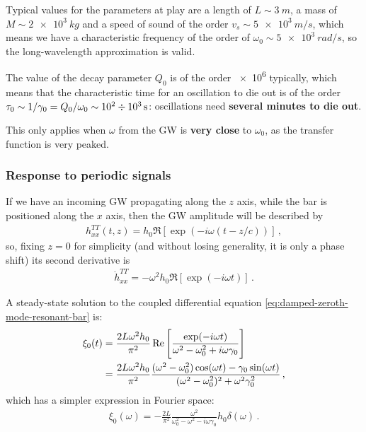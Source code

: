 \documentclass[main.tex]{subfiles}
\begin{document}
Typical values for the parameters at play are a length of \(L \sim \SI{3}{m}\), a mass of \(M \sim \SI{2e3}{kg}\) and a speed of sound of the order \(v_s \sim \SI{5e3}{m/s}\), which means we have a characteristic frequency of the order of \(\omega_0 \sim \SI{5e3}{rad / s}\), so the long-wavelength approximation is valid. 

The value of the decay parameter \(Q_0 \) is of the order \num{e6} typically, which means that the characteristic time for an oscillation to die out is of the order \(\tau_0 \sim 1/ \gamma_0 = Q_0 / \omega_0 \sim \num{e2} \divisionsymbol \SI{e3}{s}\): oscillations need \textbf{several minutes to die out}. 

This only applies when \(\omega \) from the GW is \textbf{very close} to \(\omega_0 \), as the transfer function is very peaked. 


\subsubsection{Response to periodic signals}

If we have an incoming GW propagating along the \(z\) axis, while the bar is positioned along the \(x\) axis, then the GW amplitude will be described by 
%
\begin{align}
h_{xx}^{TT} (t, z) = h_0 \Re[\exp(-i \omega (t - z/c))]
\,,
\end{align}
%
so, fixing \(z =0 \) for simplicity (and without losing generality, it is only a phase shift) its second derivative is 
%
\begin{align}
\ddot{h}_{xx}^{TT} = - \omega^2 h_0 \Re[\exp(-i \omega t)]
\,.
\end{align}

A steady-state solution to the coupled differential equation \eqref{eq:damped-zeroth-mode-resonant-bar} is:
%
\begin{align}
\xi_0 (t) &= \frac{2L \omega^2 h_0 }{\pi^2}
\Re \qty[\frac{\exp(-i \omega t)}{\omega^2 - \omega_0^2 + i \omega \gamma_0 }] \\
&= \frac{2 L \omega^2 h_0 }{\pi^2} \frac{(\omega^2 - \omega^2_{0}) \cos(\omega t) - \gamma_0 \sin(\omega t)}{(\omega^2-\omega_0^2)^2 + \omega^2 \gamma_0^2}
\,,
\end{align}
%
which has a simpler expression in Fourier space:
%
\begin{align}
\xi_0 (\omega ) = - \frac{2L}{\pi^2} \frac{\omega^2}{\omega_0^2 - \omega^2 - i \omega \gamma_0 } h_0 \delta (\omega )
\,.
\end{align}
\end{document}
